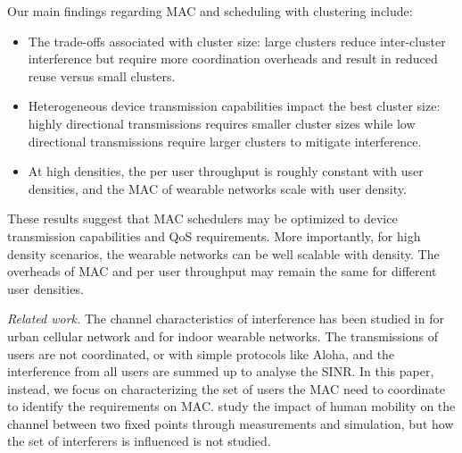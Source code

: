 \documentclass[10pt, conference, letterpaper]{IEEEtran}
\begin{document}
Our main findings regarding MAC and scheduling with clustering include:
\begin{itemize}
	\item The trade-offs associated with cluster size: large clusters reduce inter-cluster interference but require more coordination overheads and result in reduced reuse versus small clusters.
	\item Heterogeneous device transmission capabilities impact the best cluster size: highly directional transmissions requires smaller cluster sizes while low directional transmissions require larger clusters to mitigate interference. 
	\item At high densities, the per user throughput is roughly constant with user densities, and the MAC of wearable networks scale with user density. %
\end{itemize}

These results suggest that MAC schedulers may be optimized to device transmission capabilities and QoS requirements. 
More importantly, for high density scenarios, the wearable networks can be well scalable with density. The overheads of MAC and per user throughput may remain the same for different user densities.

\emph{Related work.}
The channel characteristics of interference has been studied in \cite{urbanblockage} for urban cellular network and \cite{interferencefinitesized}\cite{enclosedmmwave} for indoor wearable networks. 
The transmissions of users are not coordinated, or with simple protocols like Aloha, and the interference from all users are summed up to analyse the SINR.
In this paper, instead, we focus on characterizing the set of users the MAC need to coordinate to identify the requirements on MAC.
\cite{humanactivity}\cite{timevaryingpathshadowing}\cite{blockagein60ghz} study the impact of human mobility on the channel between two fixed points through measurements and simulation, but how the set of interferers is influenced is not studied.
\end{document}
